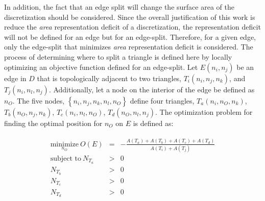In addition, the fact that an edge split will change the surface area of
the discretization should be considered. Since the overall justification
of this work is reduce the {\it area} representation deficit of a
discretization, the representation deficit will not be defined for an
edge but for an edge-split. Therefore, for a given edge, only the
edge-split that minimizes {\it area} representation deficit is
considered. The process of determining where to split a triangle is
defined here by locally optimizing an objective function defined for an
edge-split.  Let $E\left(n_i,n_j\right)$ be an edge in $D$ that is
topologically adjacent to two triangles, $T_i\left(n_i,n_j,n_k\right)$,
and $T_j\left(n_i,n_l,n_j\right)$. Additionally, let a node on the
interior of the edge be defined as $n_O$. The five nodes,
$\left\{n_i,n_j,n_k,n_l,n_O\right\}$ define four triangles,
$T_a\left(n_i,n_O,n_k\right)$, $T_b\left(n_O,n_j, n_k\right)$,
$T_c\left(n_i,n_l,n_O\right)$, $T_d\left(n_O,n_l,n_j\right)$.  The
optimization problem for finding the optimal position for $n_O$ on $E$
is defined as:

\begin{eqnarray*}
\begin{array}{rcl}
\underset{n_O}{\text{minimize}} \ O(E) & = & - \frac{ A\left(T_a\right) + A\left(T_b\right) + A\left(T_c\right) + A\left(T_d\right) }{ A\left(T_i\right) + A\left(T_j\right) } \\
\text{subject to} \ N_{T_a} & > & 0 \\
N_{T_b} & > & 0 \\ 
N_{T_c} & > & 0 \\
N_{T_d} & > & 0 \\
\end{array}
\end{eqnarray*}
